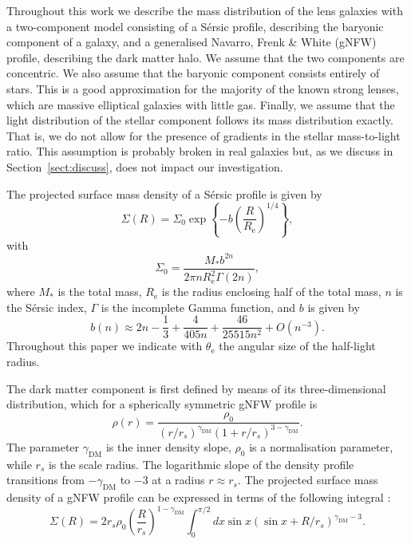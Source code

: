 \documentclass{aa}
\def\reff{R_{\mathrm{e}}}
\def\mstar{M_*}
\def\gammadm{\gamma_{\mathrm{DM}}}
\def\teff{\theta_{\mathrm{e}}}
\def\Sref#1{Section~\ref{#1}\xspace}
\begin{document}
Throughout this work we describe the mass distribution of the lens galaxies with a two-component model consisting of a S\'{e}rsic profile, describing the baryonic component of a galaxy, and a generalised Navarro, Frenk \& White (gNFW) profile, describing the dark matter halo.
We assume that the two components are concentric.
We also assume that the baryonic component consists entirely of stars.
This is a good approximation for the majority of the known strong lenses, which are massive elliptical galaxies with little gas.
Finally, we assume that the light distribution of the stellar component follows its mass distribution exactly. That is, we do not allow for the presence of gradients in the stellar mass-to-light ratio. This assumption is probably broken in real galaxies but, as we discuss in \Sref{sect:discuss}, does not impact our investigation.

The projected surface mass density of a S\'{e}rsic profile is given by
\begin{equation}
\Sigma(R) = \Sigma_0 \exp{\left\{-b\left(\frac{R}{\reff}\right)^{1/4}\right\}},
\end{equation}
with
\begin{equation}
\Sigma_0 = \frac{\mstar b^{2n}}{2\pi n \reff^2 \Gamma(2n)},
\end{equation}
where $\mstar$ is the total mass, $\reff$ is the radius enclosing half of the total mass, $n$ is the S\'{e}rsic index, $\Gamma$ is the incomplete Gamma function, and $b$ is given by \citep{C+B99}
\begin{equation}
b(n) \approx 2n -\frac13 + \frac{4}{405n} + \frac{46}{25515n^2} + O(n^{-3}).
\end{equation}
Throughout this paper we indicate with $\teff$ the angular size of the half-light radius.

The dark matter component is first defined by means of its three-dimensional distribution, which for a spherically symmetric gNFW profile is
\begin{equation}
\rho(r) = \dfrac{\rho_0}{(r/r_s)^{\gammadm}\left(1 + r/r_s\right)^{3-\gammadm}}.
\end{equation}
The parameter $\gammadm$ is the inner density slope, $\rho_0$ is a normalisation parameter, while $r_s$ is the scale radius. The logarithmic slope of the density profile transitions from $-\gammadm$ to $-3$ at a radius $r\approx r_s$.
The projected surface mass density of a gNFW profile can be expressed in terms of the following integral \citep{WTS01}:
\begin{equation}
\Sigma(R) = 2r_s\rho_0 \left(\frac{R}{r_s}\right)^{1-\gammadm}\int_0^{\pi/2} dx \sin{x}(\sin{x} + R/r_s)^{\gammadm-3}.
\end{equation}
\end{document}
